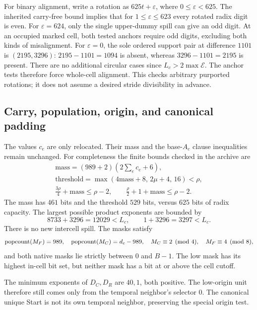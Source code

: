 For binary alignment, write a rotation as \(625t+\varepsilon\),
where \(0\le\varepsilon<625\).
The inherited carry-free bound implies that for
\(1\le\varepsilon\le623\) every rotated radix digit is even.
For \(\varepsilon=624\), only the single upper-dummy spill can
give an odd digit.
At an occupied marked cell, both tested anchors require odd
digits, excluding both kinds of misalignment.
For \(\varepsilon=0\), the sole ordered support pair at
difference \(1101\) is \((2195,3296)\):
\(2195-1101=1094\) is absent, whereas
\(3296-1101=2195\) is present.
There are no additional circular cases since
\(L_c>2\max\mathcal E\).
The anchor tests therefore force whole-cell alignment.
This checks arbitrary purported rotations; it does not assume
a desired stride divisibility in advance.

\subsection{Carry, population, origin, and canonical padding}

The values \(c_e\) are only relocated. Their mass and the
base-\(A_c\) clause inequalities remain unchanged.
For completeness the finite bounds checked in the archive are
\[
\begin{gathered}
\mathrm{mass}=(989+2)\left(2\sum_e c_e+6\right),\\
\mathrm{threshold}=\max(4\mathrm{mass}+8,\,2\mu+4,\,16)<\rho,\\
\frac{3\rho}{4}+\mathrm{mass}\le\rho-2,\qquad
\frac{\rho}{2}+1+\mathrm{mass}\le\rho-2.
\end{gathered}
\tag{7.6}
\]
The mass has \(461\) bits and the threshold \(529\) bits, versus
\(625\) bits of radix capacity.
The largest possible product exponents are bounded by
\[
8733+3296=12029<L_c,\qquad
1+3296=3297<L_c.
\]
There is no new intercell spill.
The masks satisfy
\[
\operatorname{popcount}(M_F)=989,\quad \operatorname{popcount}(M_C)=d_c-989,\quad
M_C\equiv2\pmod4,\quad M_F\equiv4\pmod8,
\]
and both native masks lie strictly between \(0\) and \(B-1\).
The low mask has its highest in-cell bit set, but neither mask
has a bit at or above the cell cutoff.

The minimum exponents of \(D_C,D_R\) are \(40,1\), both positive.
The low-origin unit therefore still comes only from the temporal
neighbor's selector \(0\). The canonical unique Start is not its
own temporal neighbor, preserving the special origin test.

